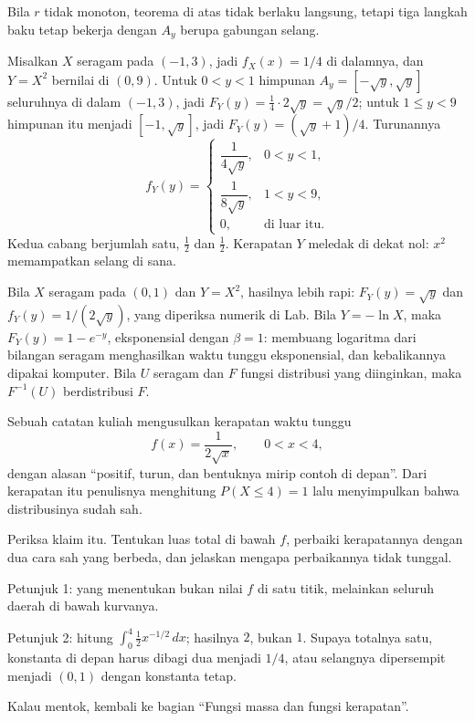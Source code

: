 Bila $r$ tidak monoton, teorema di atas tidak berlaku langsung, tetapi tiga langkah
baku tetap bekerja dengan $A_y$ berupa gabungan selang.

\begin{contoh}
Misalkan $X$ seragam pada $(-1,3)$, jadi $f_X(x)=1/4$ di dalamnya, dan $Y=X^2$
bernilai di $(0,9)$. Untuk $0<y<1$ himpunan $A_y=[-\sqrt y,\sqrt y]$ seluruhnya di
dalam $(-1,3)$, jadi $F_Y(y)=\tfrac14\cdot2\sqrt y=\sqrt y/2$; untuk $1\le y<9$
himpunan itu menjadi $[-1,\sqrt y]$, jadi $F_Y(y)=(\sqrt y+1)/4$. Turunannya
\[
f_Y(y)=\begin{cases}
\dfrac{1}{4\sqrt y}, & 0<y<1,\\[4pt]
\dfrac{1}{8\sqrt y}, & 1<y<9,\\[4pt]
0, & \text{di luar itu}.
\end{cases}
\]
Kedua cabang berjumlah satu, $\tfrac12$ dan $\tfrac12$. Kerapatan $Y$ meledak di
dekat nol: $x^2$ memampatkan selang di sana.
\end{contoh}

Bila $X$ seragam pada $(0,1)$ dan $Y=X^2$, hasilnya lebih rapi: $F_Y(y)=\sqrt y$ dan
$f_Y(y)=1/(2\sqrt y)$, yang diperiksa numerik di Lab. Bila $Y=-\ln X$, maka
$F_Y(y)=1-e^{-y}$, eksponensial dengan $\beta=1$: membuang logaritma dari bilangan
seragam menghasilkan waktu tunggu eksponensial, dan kebalikannya dipakai komputer.
Bila $U$ seragam dan $F$ fungsi distribusi yang diinginkan, maka $F^{-1}(U)$
berdistribusi $F$.

\begin{tantangan}
Sebuah catatan kuliah mengusulkan kerapatan waktu tunggu
\[
f(x)=\frac{1}{2\sqrt{x}},\qquad 0<x<4,
\]
dengan alasan ``positif, turun, dan bentuknya mirip contoh di depan''. Dari kerapatan
itu penulisnya menghitung $P(X\le4)=1$ lalu menyimpulkan bahwa distribusinya sudah sah.

Periksa klaim itu. Tentukan luas total di bawah $f$, perbaiki kerapatannya dengan dua
cara sah yang berbeda, dan jelaskan mengapa perbaikannya tidak tunggal.

Petunjuk 1: yang menentukan bukan nilai $f$ di satu titik, melainkan seluruh daerah di
bawah kurvanya.

Petunjuk 2: hitung $\int_0^4\tfrac12 x^{-1/2}\,dx$; hasilnya $2$, bukan $1$. Supaya
totalnya satu, konstanta di depan harus dibagi dua menjadi $1/4$, atau selangnya
dipersempit menjadi $(0,1)$ dengan konstanta tetap.

Kalau mentok, kembali ke bagian ``Fungsi massa dan fungsi kerapatan''.
\end{tantangan}

